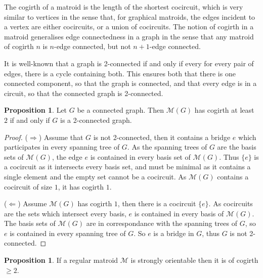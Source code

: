 \documentclass[12pt]{report}
\theoremstyle{definition}
\newtheorem{proposition}[theorem]{Proposition}
\def\calM{\mathcal M}
\theoremstyle{upright}
\begin{document}
The cogirth of a matroid is the length of the shortest cocircuit, which is very similar to vertices in the sense that, for graphical matroids, the edges incident to a vertex are either cocircuits, or a union of cocircuits.
The notion of cogirth in a matroid generalises edge connectedness in a graph in the sense that any matroid of cogirth $n$ is $n$-edge connected, but not $n+1$-edge connected.

It is well-known that a graph is 2-connected if and only if every for every pair of edges, there is a cycle containing both.
This ensures both that there is one connected component, so that the graph is connected, and that every edge is in a circuit, so that the connected graph is 2-connected.

\begin{proposition}

    Let $G$ be a connected graph.
    Then $\calM(G)$ has cogirth at least $2$ if and only if $G$ is a 2-connected graph.
    
\end{proposition}

\begin{proof}

    ($\Rightarrow$) Assume that $G$ is not 2-connected, then it contains a bridge $e$ which participates in every spanning tree of $G$.
    As the spanning trees of $G$ are the basis sets of $\calM(G)$, the edge $e$ is contained in every basis set of $\calM(G)$.
    Thus $\{e\}$ is a cocircuit as it intersects every basis set, and must be minimal as it contains a single element and the empty set cannot be a cocircuit.
    As $\calM(G)$ contains a cocircuit of size $1$, it has cogirth $1$.

    ($\Leftarrow$) Assume $\calM(G)$ has cogirth $1$, then there is a cocircuit $\{e\}$.
    As cocircuits are the sets which intersect every basis, $e$ is contained in every basis of $\calM(G)$.
    The basis sets of $\calM(G)$ are in correspondance with the spanning trees of $G$, so $e$ is contained in every spanning tree of $G$.
    So $e$ is a bridge in $G$, thus $G$ is not 2-connected.
    
\end{proof}


\begin{proposition}

    If a regular matroid $\calM$ is strongly orientable then it is of cogirth $\geq 2$.

\end{proposition}
\end{document}
